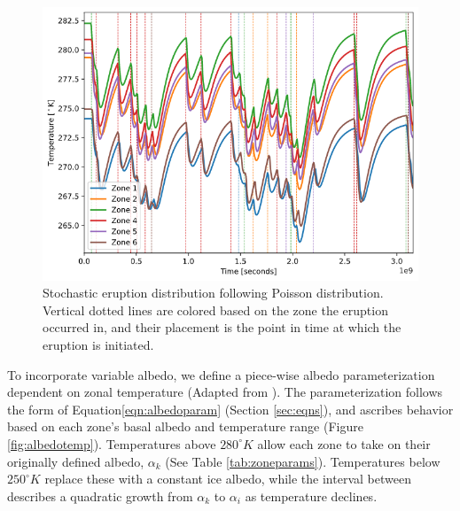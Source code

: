 \documentclass{article}
\begin{document}
\begin{figure}[H]
    \centering
    \includegraphics[scale=0.4]{stocerupt.png}
    \caption{
        Stochastic eruption distribution following Poisson distribution.
        Vertical dotted lines are colored based on the zone the eruption
        occurred in, and their placement is the point in time at which the
        eruption is initiated.
    }
    \label{fig:stocherupt}
\end{figure}
\FloatBarrier

To incorporate variable albedo, we define a piece-wise albedo parameterization
dependent on zonal temperature (Adapted from \cite{jellinek_ps}).
The parameterization follows the form of Equation\ref{eqn:albedoparam}
(Section \ref{sec:eqns}), and ascribes behavior based on each zone's basal
albedo and temperature range (Figure \ref{fig:albedotemp}). Temperatures above
$280^{\circ}K$ allow each zone to take on their originally defined albedo,
$\alpha_k$ (See Table \ref{tab:zoneparams}). Temperatures below $250^{\circ}K$
replace these with a constant ice albedo, while the interval between describes a
quadratic growth from $\alpha_k$ to $\alpha_i$ as temperature declines.
\end{document}
